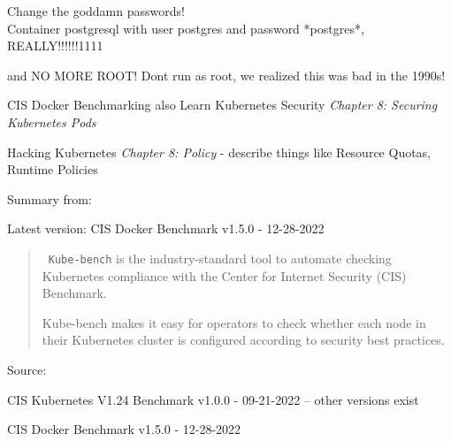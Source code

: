 \documentclass[Screen16to9,17pt]{foils}
\begin{document}

\begin{list2}
\item Change the goddamn passwords!\\
Container postgresql with user postgres and password *postgres*, REALLY!!!!!!1111
\item and NO MORE ROOT! Dont run as root, we realized this was bad in the 1990s!
\item CIS Docker Benchmarking also Learn Kubernetes Security \emph{Chapter 8: Securing Kubernetes Pods}
\item Hacking Kubernetes \emph{Chapter 8: Policy} - describe things like Resource Quotas, Runtime Policies
\end{list2}


Summary from: 

\begin{list2}
\item Latest version: CIS Docker Benchmark v1.5.0 - 12-28-2022
\end{list2}



\begin{quote}
\faWrench\ \verb+Kube-bench+ is the industry-standard tool to automate checking Kubernetes compliance with the Center for Internet Security (CIS) Benchmark.

Kube-bench makes it easy for operators to check whether each node in their Kubernetes cluster is configured according to security best practices.
\end{quote}
Source: 

\begin{list2}
\item CIS Kubernetes V1.24 Benchmark v1.0.0 - 09-21-2022 -- other versions exist
\item CIS Docker Benchmark v1.5.0 - 12-28-2022
\end{list2}


\end{document}

